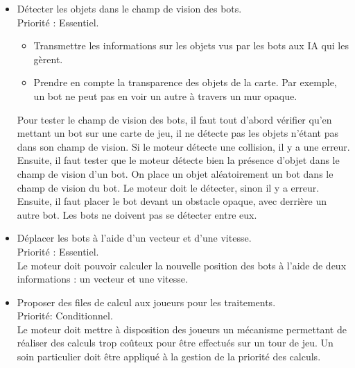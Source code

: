 \documentclass[french]{article}
\begin{document}
\begin{itemize}
                
        \item Détecter les objets dans le champ de vision des bots. \\
            Priorité : Essentiel.
            \begin{itemize}
                \item Transmettre les informations sur les objets vus par les bots aux IA qui les gèrent.
                \item Prendre en compte la transparence des objets de la carte. Par exemple, un bot ne peut pas en voir un autre à travers un mur opaque.\\
            \end{itemize}
            Pour tester le champ de vision des bots, il faut tout d'abord vérifier qu'en mettant un bot sur une carte de jeu, il ne détecte pas les objets n'étant pas dans son champ de vision. Si le moteur détecte une collision, il y a une erreur. \\
            Ensuite, il faut tester que le moteur détecte bien la présence d'objet dans le champ de vision d'un bot.
            On place un objet aléatoirement un bot dans le champ de vision du bot. Le moteur doit le détecter, sinon il y a erreur. \\
            Ensuite, il faut placer le bot devant un obstacle opaque, avec derrière un autre bot. Les bots ne doivent pas se détecter entre eux.\\
                
        \item Déplacer les bots à l'aide d'un vecteur et d'une vitesse.\\
                Priorité : Essentiel.\\
                Le moteur doit pouvoir calculer la nouvelle position des bots à l'aide de deux informations : un vecteur et une vitesse. \\
                
                
        \item Proposer des files de calcul aux joueurs pour les traitements.\\
            Priorité: Conditionnel.\\
            Le moteur doit mettre à disposition des joueurs un mécanisme permettant de réaliser des calculs trop coûteux pour être effectués sur un tour de jeu. Un soin particulier doit être appliqué à la gestion de la priorité des calculs. \\ %


\end{itemize}
\end{document}
